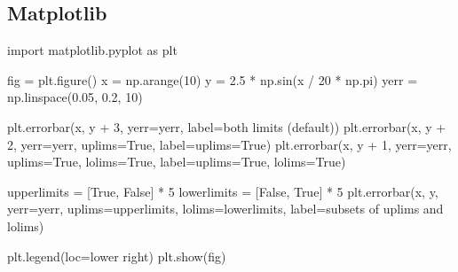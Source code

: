 \documentclass[
  letterpaper,
  DIV=11,
  numbers=noendperiod]{scrreprt}
\newenvironment{Shaded}{\begin{snugshade}}{\end{snugshade}}
\newcommand{\DecValTok}[1]{\textcolor[rgb]{0.68,0.00,0.00}{#1}}
\newcommand{\FloatTok}[1]{\textcolor[rgb]{0.68,0.00,0.00}{#1}}
\newcommand{\ImportTok}[1]{\textcolor[rgb]{0.00,0.46,0.62}{#1}}
\newcommand{\NormalTok}[1]{\textcolor[rgb]{0.00,0.46,0.62}{#1}}
\newcommand{\OperatorTok}[1]{\textcolor[rgb]{0.37,0.37,0.37}{#1}}
\newcommand{\FloatTok}[1]{\textcolor[rgb]{0.68,0.00,0.00}{#1}}
\newcommand{\ImportTok}[1]{\textcolor[rgb]{0.00,0.48,0.65}{#1}}
\newcommand{\NormalTok}[1]{\textcolor[rgb]{0.00,0.48,0.65}{#1}}
\newcommand{\OperatorTok}[1]{\textcolor[rgb]{0.37,0.37,0.37}{#1}}
\newcommand{\StringTok}[1]{\textcolor[rgb]{0.13,0.47,0.30}{#1}}
\newcommand{\VariableTok}[1]{\textcolor[rgb]{0.07,0.07,0.07}{#1}}
\begin{document}
\begin{Shaded}
\begin{Highlighting}[]
\hypertarget{matplotlib}{%
\section{Matplotlib}\label{matplotlib}}

\begin{Shaded}
\begin{Highlighting}[]
\ImportTok{import}\NormalTok{ matplotlib.pyplot }\ImportTok{as}\NormalTok{ plt}

\NormalTok{fig }\OperatorTok{=}\NormalTok{ plt.figure()}
\NormalTok{x }\OperatorTok{=}\NormalTok{ np.arange(}\DecValTok{10}\NormalTok{)}
\NormalTok{y }\OperatorTok{=} \FloatTok{2.5} \OperatorTok{*}\NormalTok{ np.sin(x }\OperatorTok{/} \DecValTok{20} \OperatorTok{*}\NormalTok{ np.pi)}
\NormalTok{yerr }\OperatorTok{=}\NormalTok{ np.linspace(}\FloatTok{0.05}\NormalTok{, }\FloatTok{0.2}\NormalTok{, }\DecValTok{10}\NormalTok{)}

\NormalTok{plt.errorbar(x, y }\OperatorTok{+} \DecValTok{3}\NormalTok{, yerr}\OperatorTok{=}\NormalTok{yerr, label}\OperatorTok{=}\StringTok{\textquotesingle{}both limits (default)\textquotesingle{}}\NormalTok{)}
\NormalTok{plt.errorbar(x, y }\OperatorTok{+} \DecValTok{2}\NormalTok{, yerr}\OperatorTok{=}\NormalTok{yerr, uplims}\OperatorTok{=}\VariableTok{True}\NormalTok{, label}\OperatorTok{=}\StringTok{\textquotesingle{}uplims=True\textquotesingle{}}\NormalTok{)}
\NormalTok{plt.errorbar(x, y }\OperatorTok{+} \DecValTok{1}\NormalTok{, yerr}\OperatorTok{=}\NormalTok{yerr, uplims}\OperatorTok{=}\VariableTok{True}\NormalTok{, lolims}\OperatorTok{=}\VariableTok{True}\NormalTok{,}
\NormalTok{             label}\OperatorTok{=}\StringTok{\textquotesingle{}uplims=True, lolims=True\textquotesingle{}}\NormalTok{)}

\NormalTok{upperlimits }\OperatorTok{=}\NormalTok{ [}\VariableTok{True}\NormalTok{, }\VariableTok{False}\NormalTok{] }\OperatorTok{*} \DecValTok{5}
\NormalTok{lowerlimits }\OperatorTok{=}\NormalTok{ [}\VariableTok{False}\NormalTok{, }\VariableTok{True}\NormalTok{] }\OperatorTok{*} \DecValTok{5}
\NormalTok{plt.errorbar(x, y, yerr}\OperatorTok{=}\NormalTok{yerr, uplims}\OperatorTok{=}\NormalTok{upperlimits, lolims}\OperatorTok{=}\NormalTok{lowerlimits,}
\NormalTok{             label}\OperatorTok{=}\StringTok{\textquotesingle{}subsets of uplims and lolims\textquotesingle{}}\NormalTok{)}

\NormalTok{plt.legend(loc}\OperatorTok{=}\StringTok{\textquotesingle{}lower right\textquotesingle{}}\NormalTok{)}
\NormalTok{plt.show(fig)}
\end{Highlighting}
\end{Shaded}


\end{Highlighting}
\end{Shaded}
\end{document}
